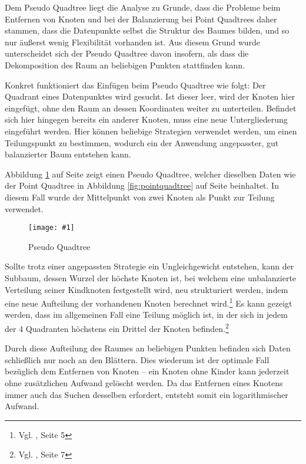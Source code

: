 \documentclass[%
			paper=a4,%
			DIV12,
			draft=false,%
			titlepage
			]{scrartcl}
\newcommand{\zit}[3]{#1 \cite{#2}, #3}
\newcommand{\footzit}[3]{\footnote{\zit{#1}{#2}{#3}}}
\newcommand{\myfig}[4] {
 \begin{figure}[tbph]
	 \centering
	 \texttt{[image: \#1]}
	 \caption{#4}
	 \label{fig:#2}
 \end{figure}
}
\begin{document}
Dem Pseudo Quadtree liegt die Analyse zu Grunde, dass die Probleme beim Entfernen von Knoten und bei der Balanzierung bei Point Quadtrees daher stammen, dass die Datenpunkte selbst die Struktur des Baumes bilden, und so nur äußerst wenig Flexibilität vorhanden ist.
Aus diesem Grund wurde unterscheidet sich der Pseudo Quadtree davon insofern, als dass die Dekomposition des Raum an beliebigen Punkten stattfinden kann. 

Konkret funktioniert das Einfügen beim Pseudo Quadtree wie folgt:
Der Quadrant eines Datenpunktes wird gesucht.
Ist dieser leer, wird der Knoten hier eingefügt, ohne den Raum an dessen Koordinaten weiter zu unterteilen.
Befindet sich hier hingegen bereits ein anderer Knoten, muss eine neue Untergliederung eingeführt werden.
Hier können beliebige Strategien verwendet werden, um einen Teilungspunkt zu bestimmen, wodurch ein der Anwendung angepasster, gut balanzierter Baum entstehen kann.

Abbildung \ref{fig:pseudoquadtree} auf Seite \pageref{fig:pseudoquadtree} zeigt einen Pseudo Quadtree, welcher dieselben Daten wie der Point Quadtree in Abbildung \ref{fig:pointquadtree} auf Seite \pageref{fig:pointquadtree} beinhaltet.
In diesem Fall wurde der Mittelpunkt von zwei Knoten als Punkt zur Teilung verwendet.
\myfig{img/pseudoquadtree-ins3-trimmed}{pseudoquadtree}{width=.6\textwidth}{Pseudo Quadtree}

Sollte trotz einer angepassten Strategie ein Ungleichgewicht entstehen, kann der Subbaum, dessen Wurzel der höchste Knoten ist, bei welchem eine unbalanzierte Verteilung seiner Kindknoten festgestellt wird, neu strukturiert werden, indem eine neue Aufteilung der vorhandenen Knoten berechnet wird.\footzit{Vgl.}{DBLP:journals/acta/OvermarsL82}{Seite 5} %
Es kann gezeigt werden, dass im allgemeinen Fall eine Teilung möglich ist, in der sich in jedem der 4 Quadranten höchstens ein Drittel der Knoten befinden.\footzit{Vgl.}{DBLP:journals/acta/OvermarsL82}{Seite 7} %

Durch diese Aufteilung des Raumes an beliebigen Punkten befinden sich Daten schließlich nur noch an den Blättern. Dies wiederum ist der optimale Fall bezüglich dem Entfernen von Knoten -- ein Knoten ohne Kinder kann jederzeit ohne zusätzlichen Aufwand gelöscht werden. Da das Entfernen eines Knotens immer auch das Suchen desselben erfordert, entsteht somit ein logarithmischer Aufwand.

\end{document}
